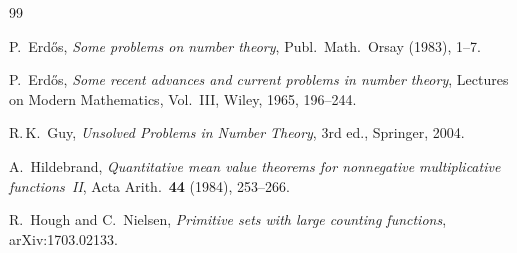 \documentclass[11pt,a4paper]{amsart}
\theoremstyle{plain}
\theoremstyle{definition}
\begin{document}
\begin{thebibliography}{99}

 P.~Erd\H{o}s, 
\emph{Some problems on number theory}, 
Publ.\ Math.\ Orsay (1983), 1--7.

 P.~Erd\H{o}s,
\emph{Some recent advances and current problems in number theory},
Lectures on Modern Mathematics, Vol.~III, Wiley, 1965, 196--244.

 R.\,K.~Guy,
\emph{Unsolved Problems in Number Theory}, 3rd ed., Springer, 2004.

 A.~Hildebrand,
\emph{Quantitative mean value theorems for nonnegative multiplicative functions~II},
Acta Arith.\ \textbf{44} (1984), 253--266.

 R.~Hough and C.~Nielsen,
\emph{Primitive sets with large counting functions},
arXiv:1703.02133.

\end{thebibliography}
\end{document}
